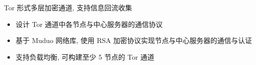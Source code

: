 \documentclass{resume}
\begin{document}
\begin{onehalfspacing}
Tor 形式多层加密通道, 支持信息回流收集
\begin{itemize}
  \item 设计 Tor 通道中各节点与中心服务器的通信协议
  \item 基于 Muduo 网络库, 使用 RSA 加密协议实现节点与中心服务器的通信与认证
  \item 支持负载均衡, 可构建至少 5 节点的 Tor 通道
\end{itemize}
\end{onehalfspacing}




\end{document}

